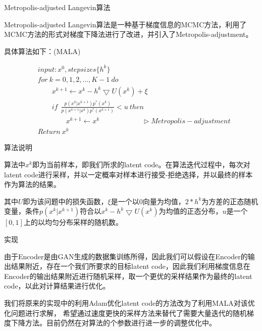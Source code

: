 \documentclass[9pt]{beamer}
\begin{document}
\begin{frame}{Metropolis-adjusted Langevin算法}

Metropolis-adjusted Langevin算法是一种基于梯度信息的MCMC方法，利用了MCMC方法的形式对梯度下降法进行了改进，并引入了Metropolis-adjustment。

具体算法如下：(MALA)

\begin{equation}
\begin{aligned}
& input:x^{0}, stepsizes \{ h^{k}\}\\
& for \  k = 0,1,2,\ldots,K-1 \ do\\
& \qquad x^{k+1} \leftarrow x^{k} - h^{k}\bigtriangledown U(x^{k}) + \xi \\
& \qquad if \ \  \frac{p(x^{k}|x^{k+1})p^{*}(x^{k})}{p(x^{k+1}|x^{k})p^{*}(x^{k+1})} < u \ then \\
& \qquad \qquad x^{k+1} \leftarrow x^{k} \qquad \qquad \qquad \rhd Metropolis-adjustment\\
& Return \ x^{k}
\end{aligned}
\end{equation}
  	
\end{frame}

\begin{frame}{算法说明}

\par 算法中$x^{k}$即为当前样本，即我们所求的latent code。在算法迭代过程中，每次对latent code进行采样，并以一定概率对样本进行接受-拒绝选择，并以最终的样本作为算法的结果。

\par 其中$U$即为该问题中的损失函数，$\xi$是一个以0向量为均值，$2*h^{k}$为方差的正态随机变量，条件$p(x^{k}|x^{k+1})$符合以$x^{k} - h^{k}\bigtriangledown U(x^{k})$为均值的正态分布，$u$是一个$[0,1]$上的以均匀分布采样的随机数。


   		
\end{frame}

\begin{frame}{实现}

由于Encoder是由GAN生成的数据集训练所得，因此我们可以假设在Encoder的输出结果附近，存在一个我们所要求的目标latent code，因此我们利用梯度信息在Encoder的输出结果附近进行随机采样，取一个更优的采样结果作为最终的latent code，以此对计算结果进行优化。 

我们将原来的实现中的利用Adam优化latent code的方法改为了利用MALA对该优化问题进行求解，
希望通过速度更快的采样方法来替代了需要大量迭代的随机梯度下降方法。目前仍然在对算法的个参数进行进一步的调整优化中。
\end{frame}
\end{document}
